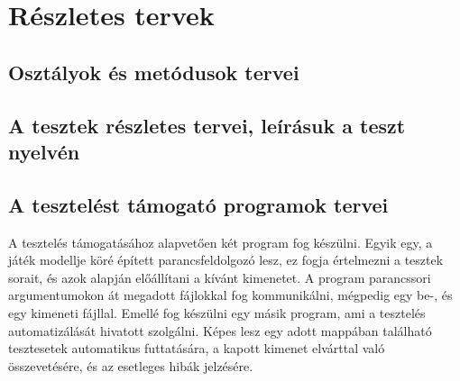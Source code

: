 %
\chapter{Részletes tervek}

\thispagestyle{fancy}

\section{Osztályok és metódusok tervei}



\section{A tesztek részletes tervei, leírásuk a teszt nyelvén}




\section{A tesztelést támogató programok tervei}
A tesztelés támogatásához alapvetően két program fog készülni. Egyik egy, a játék modellje köré épített parancsfeldolgozó lesz, ez fogja értelmezni a tesztek sorait, és azok alapján előállítani a kívánt kimenetet. A program parancssori argumentumokon át megadott fájlokkal fog kommunikálni, mégpedig egy be-, és egy kimeneti fájllal. Emellé fog készülni egy másik program, ami a tesztelés automatizálását hivatott szolgálni. Képes lesz egy adott mappában található tesztesetek automatikus futtatására, a kapott kimenet elvárttal való összevetésére, és az esetleges hibák jelzésére.

